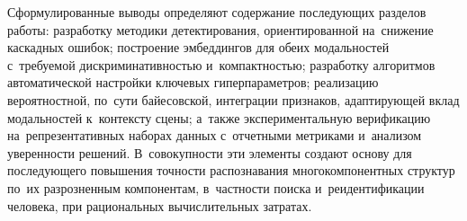 Сформулированные выводы определяют содержание последующих разделов
работы: разработку методики детектирования, ориентированной на~снижение
каскадных ошибок; построение эмбеддингов для обеих модальностей
с~требуемой дискриминативностью и~компактностью; разработку алгоритмов
автоматической настройки ключевых гиперпараметров; реализацию
вероятностной, по~сути байесовской, интеграции признаков, адаптирующей
вклад модальностей к~контексту сцены; а~также экспериментальную
верификацию на~репрезентативных наборах данных с~отчетными метриками
и~анализом уверенности решений. В~совокупности эти элементы создают
основу для последующего повышения точности распознавания многокомпонентных структур по~их разрозненным компонентам, в~частности поиска и~реидентификации
человека, при рациональных вычислительных затратах.
